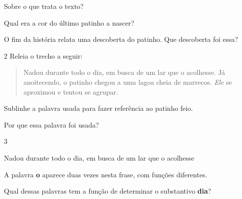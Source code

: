\begin{escolha}
\begin{quote}
\end{quote}

\begin{escolha}
\item Sobre o que trata o texto?


\item Qual era a cor do último patinho a nascer?


\item O fim da história relata uma descoberta do patinho. Que descoberta foi essa?

\end{escolha}

\num{2} Releia o trecho a seguir:

\begin{quote}
Nadou durante todo o dia, em busca de um lar que o acolhesse. Já
anoitecendo, o patinho chegou a uma lagoa cheia de marrecos. \emph{Ele}
se aproximou e tentou se agrupar.
\end{quote}

\begin{escolha}
\item Sublinhe a palavra usada para fazer referência ao patinho feio.

\item Por que essa palavra foi usada?

\end{escolha}


\num{3}

\begin{mdframed}[linewidth=10pt,linecolor=salmao!20,backgroundcolor=salmao!20,roundcorner=20pt]
Nadou durante todo o dia, em busca de um lar que o acolhesse
\end{mdframed}

A palavra \textbf{o} aparece duas vezes nesta frase, com funções diferentes.

\begin{escolha}
\item Qual dessas palavras tem a função de determinar o substantivo \textbf{dia}?


\end{escolha}
\end{escolha}
